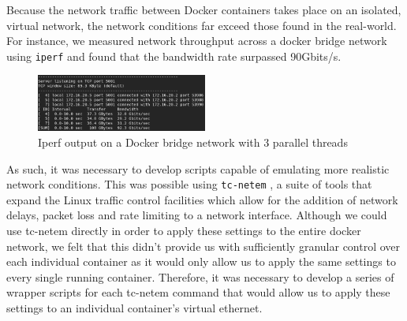 \documentclass[msc,deptreport, cs]{infthesis} %
\begin{document}
Because the network traffic between Docker containers takes place on an isolated, virtual network, the network conditions far exceed those found in the real-world. For instance, we measured network throughput across a docker bridge network using \texttt{iperf}\cite{iperf} and found that the bandwidth rate surpassed 90Gbits/s. 


\begin{figure}[h]
\centering
\includegraphics[width=0.5\textwidth]{screenshot.png}
\caption{Iperf output on a Docker bridge network with 3 parallel threads}
\end{figure}
\vspace{-5mm}
As such, it was necessary to develop scripts capable of emulating more realistic network conditions. This was possible using \texttt{tc-netem} \cite{tc-netem}, a suite of tools that expand the Linux traffic control facilities which allow for the addition of network delays, packet loss and rate limiting to a network interface. Although we could use tc-netem directly in order to apply these settings to the entire docker network, we felt that this didn't provide us with sufficiently granular control over each individual container as it would only allow us to apply the same settings to every single running container. Therefore, it was necessary to develop a series of wrapper scripts for each tc-netem command that would allow us to apply these settings to an individual container's virtual ethernet.


  
\end{document}
